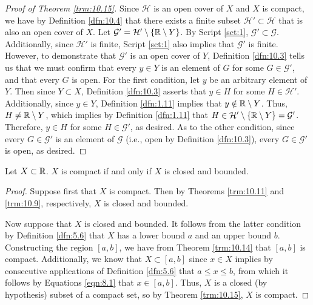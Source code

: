\documentclass[../main.tex]{subfiles}
\begin{document}
\begin{theorem}
\begin{proof}[Proof of Theorem \ref{trm:10.15}]
        Since $\mathcal{H}$ is an open cover of $X$ and $X$ is compact, we have by Definition \ref{dfn:10.4} that there exists a finite subset $\mathcal{H}'\subset\mathcal{H}$ that is also an open cover of $X$. Let $\mathcal{G}'=\mathcal{H}'\setminus\{\mathbb{R}\setminus Y\}$. By Script \ref{sct:1}, $\mathcal{G}'\subset\mathcal{G}$. Additionally, since $\mathcal{H}'$ is finite, Script \ref{sct:1} also implies that $\mathcal{G}'$ is finite. However, to demonstrate that $\mathcal{G}'$ is an open cover of $Y$, Definition \ref{dfn:10.3} tells us that we must confirm that every $y\in Y$ is an element of $G$ for some $G\in\mathcal{G}'$, and that every $G$ is open. For the first condition, let $y$ be an arbitrary element of $Y$. Then since $Y\subset X$, Definition \ref{dfn:10.3} asserts that $y\in H$ for some $H\in\mathcal{H}'$. Additionally, since $y\in Y$, Definition \ref{dfn:1.11} implies that $y\notin\mathbb{R}\setminus Y$. Thus, $H\neq\mathbb{R}\setminus Y$, which implies by Definition \ref{dfn:1.11} that $H\in\mathcal{H}'\setminus\{\mathbb{R}\setminus Y\}=\mathcal{G}'$. Therefore, $y\in H$ for some $H\in\mathcal{G}'$, as desired. As to the other condition, since every $G\in\mathcal{G}'$ is an element of $\mathcal{G}$ (i.e., open by Definition \ref{dfn:10.3}), every $G\in\mathcal{G}'$ is open, as desired.
    \end{proof}
\end{theorem}

\begin{theorem}\label{trm:10.16}
    Let $X\subset\mathbb{R}$. $X$ is compact if and only if $X$ is closed and bounded.
    \begin{proof}
        Suppose first that $X$ is compact. Then by Theorems \ref{trm:10.11} and \ref{trm:10.9}, respectively, $X$ is closed and bounded.\par
        Now suppose that $X$ is closed and bounded. It follows from the latter condition by Definition \ref{dfn:5.6} that $X$ has a lower bound $a$ and an upper bound $b$. Constructing the region $[a,b]$, we have from Theorem \ref{trm:10.14} that $[a,b]$ is compact. Additionally, we know that $X\subset[a,b]$ since $x\in X$ implies by consecutive applications of Definition \ref{dfn:5.6} that $a\leq x\leq b$, from which it follows by Equations \ref{eqn:8.1} that $x\in[a,b]$. Thus, $X$ is a closed (by hypothesis) subset of a compact set, so by Theorem \ref{trm:10.15}, $X$ is compact.
    \end{proof}
\end{theorem}
\end{document}
